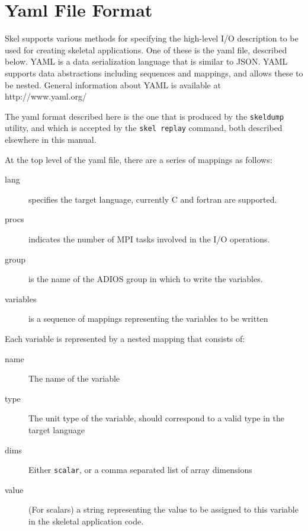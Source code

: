 \chapter{Yaml File Format}

Skel supports various methods for specifying the high-level I/O description to be
used for creating skeletal applications. One of these is the yaml file, described below.
YAML is a data serialization language that is similar
to JSON. YAML supports data abstractions including sequences and mappings, and allows
these to be nested. General information about YAML is available at http://www.yaml.org/

The yaml format described here is the one that is produced by the {\tt skeldump} utility,
and which is accepted by the {\tt skel replay} command, both described elsewhere in
this manual.
\vspace{5mm}

At the top level of the yaml file, there are a series of mappings as follows:
\begin{description}
  \item[lang] specifies the target language, currently C and fortran are supported.

  \item[procs] indicates the number of MPI tasks involved in the I/O operations.

  \item[group] is the name of the ADIOS group in which to write the variables.

  \item[variables] is a sequence of mappings representing the variables to be written

\end{description}

\vspace{5mm}
Each variable is represented by a nested mapping that consists of:
\begin{description}

  \item[name] The name of the variable

  \item[type] The unit type of the variable, should correspond to a valid type in the target language

  \item[dims] Either {\tt scalar}, or a comma separated list of array dimensions

  \item[value] (For scalars) a string representing the value to be assigned to this variable in the skeletal application code.

\end{description}


